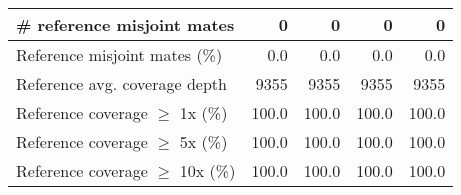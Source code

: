\documentclass[12pt,a4paper]{article}
\begin{document}
\begin{table}[ht]
\begin{center}
\begin{tabular}{|l*{4}{|r}|}
\# reference misjoint mates & 0 & 0 & 0 & 0 \\ \hline
Reference misjoint mates (\%) & 0.0 & 0.0 & 0.0 & 0.0 \\ \hline
Reference avg. coverage depth & 9355 & 9355 & 9355 & 9355 \\ \hline
Reference coverage $\geq$ 1x (\%) & 100.0 & 100.0 & 100.0 & 100.0 \\ \hline
Reference coverage $\geq$ 5x (\%) & 100.0 & 100.0 & 100.0 & 100.0 \\ \hline
Reference coverage $\geq$ 10x (\%) & 100.0 & 100.0 & 100.0 & 100.0 \\ \hline
\end{tabular}
\end{center}
\end{table}
\end{document}
